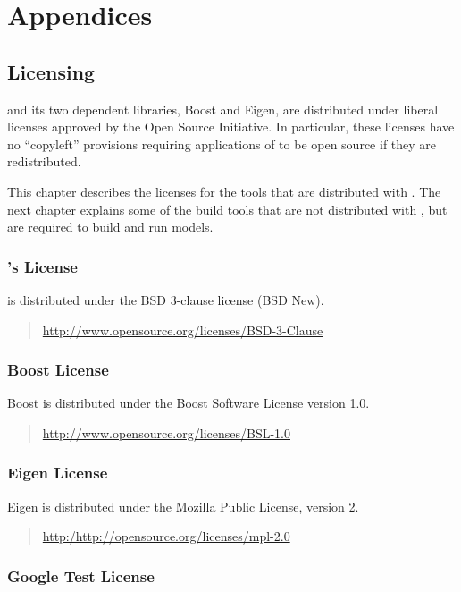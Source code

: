 
\part*{Appendices}


\chapter{Licensing}

\noindent
\Stan and its two dependent libraries, Boost and Eigen, are
distributed under liberal licenses approved by the Open Source
Initiative.  In particular, these licenses have no ``copyleft''
provisions requiring applications of \Stan to be open source if they
are redistributed.

This chapter describes the licenses for the tools that are distributed
with \Stan.  The next chapter explains some of the build tools that
are not distributed with \Stan, but are required to build and run
\Stan models.


\section{\Stan's License}

\Stan is distributed under the BSD 3-clause license (BSD New).
%
\begin{quote}
\url{http://www.opensource.org/licenses/BSD-3-Clause}
\end{quote}

\section{Boost License}

Boost is distributed under the Boost Software
License version 1.0.
%
\begin{quote}
\url{http://www.opensource.org/licenses/BSL-1.0}
\end{quote}

\section{Eigen License} 
%
Eigen is distributed under the Mozilla Public License,
version 2.
%
\begin{quote}
\url{http:/http://opensource.org/licenses/mpl-2.0}
\end{quote}

\section{Google Test License}

